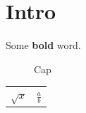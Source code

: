 \documentclass{article}
\begin{document}
\section{Intro}
Some \textbf{bold} word.
\begin{figure}
\caption{Cap}
\end{figure}
\begin{tabular}{cc}
$\sqrt{x}$ & $\frac{a}{b}$ \\
\end{tabular}
\end{document}
